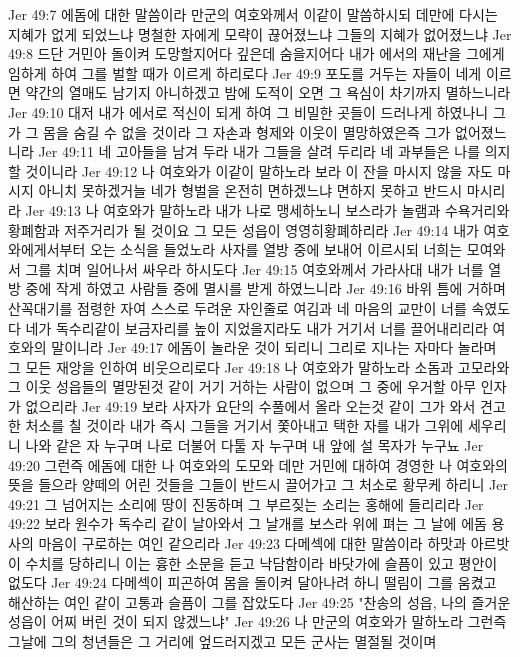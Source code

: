 Jer 49:7  에돔에 대한 말씀이라 만군의 여호와께서 이같이 말씀하시되 데만에 다시는 지혜가 없게 되었느냐 명철한 자에게 모략이 끊어졌느냐 그들의 지혜가 없어졌느냐
Jer 49:8  드단 거민아 돌이켜 도망할지어다 깊은데 숨을지어다 내가 에서의 재난을 그에게 임하게 하여 그를 벌할 때가 이르게 하리로다
Jer 49:9  포도를 거두는 자들이 네게 이르면 약간의 열매도 남기지 아니하겠고 밤에 도적이 오면 그 욕심이 차기까지 멸하느니라
Jer 49:10  대저 내가 에서로 적신이 되게 하여 그 비밀한 곳들이 드러나게 하였나니 그가 그 몸을 숨길 수 없을 것이라 그 자손과 형제와 이웃이 멸망하였은즉 그가 없어졌느니라
Jer 49:11  네 고아들을 남겨 두라 내가 그들을 살려 두리라 네 과부들은 나를 의지할 것이니라
Jer 49:12  나 여호와가 이같이 말하노라 보라 이 잔을 마시지 않을 자도 마시지 아니치 못하겠거늘 네가 형벌을 온전히 면하겠느냐 면하지 못하고 반드시 마시리라
Jer 49:13  나 여호와가 말하노라 내가 나로 맹세하노니 보스라가 놀램과 수욕거리와 황폐함과 저주거리가 될 것이요 그 모든 성읍이 영영히황폐하리라
Jer 49:14  내가 여호와에게서부터 오는 소식을 들었노라 사자를 열방 중에 보내어 이르시되 너희는 모여와서 그를 치며 일어나서 싸우라 하시도다
Jer 49:15  여호와께서 가라사대 내가 너를 열방 중에 작게 하였고 사람들 중에 멸시를 받게 하였느니라
Jer 49:16  바위 틈에 거하며 산꼭대기를 점령한 자여 스스로 두려운 자인줄로 여김과 네 마음의 교만이 너를 속였도다 네가 독수리같이 보금자리를 높이 지었을지라도 내가 거기서 너를 끌어내리리라 여호와의 말이니라
Jer 49:17  에돔이 놀라운 것이 되리니 그리로 지나는 자마다 놀라며 그 모든 재앙을 인하여 비웃으리로다
Jer 49:18  나 여호와가 말하노라 소돔과 고모라와 그 이웃 성읍들의 멸망된것 같이 거기 거하는 사람이 없으며 그 중에 우거할 아무 인자가 없으리라
Jer 49:19  보라 사자가 요단의 수풀에서 올라 오는것 같이 그가 와서 견고한 처소를 칠 것이라 내가 즉시 그들을 거기서 쫓아내고 택한 자를 내가 그위에 세우리니 나와 같은 자 누구며 나로 더불어 다툴 자 누구며 내 앞에 설 목자가 누구뇨
Jer 49:20  그런즉 에돔에 대한 나 여호와의 도모와 데만 거민에 대하여 경영한 나 여호와의 뜻을 들으라 양떼의 어린 것들을 그들이 반드시 끌어가고 그 처소로 황무케 하리니
Jer 49:21  그 넘어지는 소리에 땅이 진동하며 그 부르짖는 소리는 홍해에 들리리라
Jer 49:22  보라 원수가 독수리 같이 날아와서 그 날개를 보스라 위에 펴는 그 날에 에돔 용사의 마음이 구로하는 여인 같으리라
Jer 49:23  다메섹에 대한 말씀이라 하맛과 아르밧이 수치를 당하리니 이는 흉한 소문을 듣고 낙담함이라 바닷가에 슬픔이 있고 평안이 없도다
Jer 49:24  다메섹이 피곤하여 몸을 돌이켜 달아나려 하니 떨림이 그를 움켰고 해산하는 여인 같이 고통과 슬픔이 그를 잡았도다
Jer 49:25  "찬송의 성읍, 나의 즐거운 성읍이 어찌 버린 것이 되지 않겠느냐"
Jer 49:26  나 만군의 여호와가 말하노라 그런즉 그날에 그의 청년들은 그 거리에 엎드러지겠고 모든 군사는 멸절될 것이며
